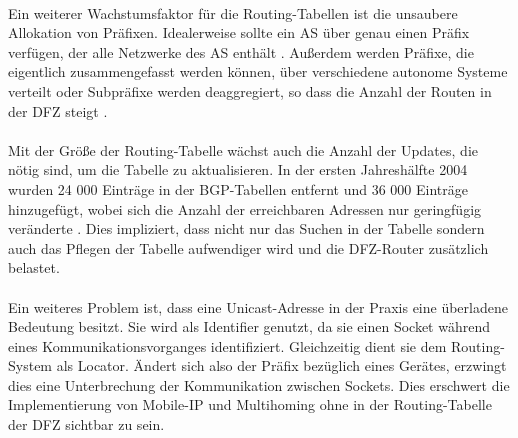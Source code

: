 \paragraph{}
Ein weiterer Wachstumsfaktor für die Routing-Tabellen ist die unsaubere Allokation von Präfixen. Idealerweise sollte ein AS über genau einen Präfix verfügen, der alle Netzwerke des AS enthält \cite{hawkinson:1996:autnomousSystems}. Außerdem werden Präfixe, die eigentlich zusammengefasst werden können, über verschiedene autonome Systeme verteilt oder Subpräfixe werden deaggregiert, so dass die Anzahl der Routen in der DFZ steigt \cite{journals/ccr/MengXZHLZ04}. \\

\paragraph{}
Mit der Größe der Routing-Tabelle wächst auch die Anzahl der Updates, die nötig sind, um die Tabelle zu aktualisieren. In der ersten Jahreshälfte 2004 wurden 24 000 Einträge in der BGP-Tabellen entfernt und 36 000 Einträge hinzugefügt, wobei sich die Anzahl der erreichbaren Adressen nur geringfügig veränderte \cite{journals/ccr/MengXZHLZ04}. Dies impliziert, dass nicht nur das Suchen in der Tabelle sondern auch das Pflegen der Tabelle aufwendiger wird und die DFZ-Router zusätzlich belastet.

\paragraph{} 
Ein weiteres Problem ist, dass eine Unicast-Adresse in der Praxis eine überladene Bedeutung besitzt. Sie wird als Identifier genutzt, da sie einen Socket während eines Kommunikationsvorganges identifiziert. Gleichzeitig dient sie dem Routing-System als Locator. Ändert sich also der Präfix bezüglich eines Gerätes, erzwingt dies eine Unterbrechung der Kommunikation zwischen Sockets. Dies erschwert die Implementierung von Mobile-IP und Multihoming ohne in der Routing-Tabelle der DFZ sichtbar zu sein.


